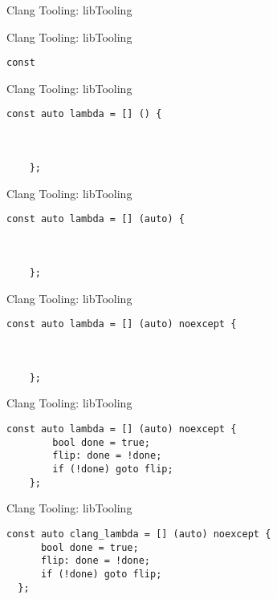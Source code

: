 \begin{frame}[fragile]{Clang Tooling: libTooling}
\end{frame}

\begin{frame}[fragile]{Clang Tooling: libTooling}
  \begin{lstlisting}[basicstyle=\large\ttfamily]
    const
  \end{lstlisting}
  \vspace{2cm}
\end{frame}

\begin{frame}[fragile]{Clang Tooling: libTooling}
  \begin{lstlisting}[basicstyle=\large\ttfamily]
    const auto lambda = [] () {



    };
  \end{lstlisting}
\end{frame}

\begin{frame}[fragile]{Clang Tooling: libTooling}
  \begin{lstlisting}[basicstyle=\large\ttfamily]
    const auto lambda = [] (auto) {



    };
  \end{lstlisting}
\end{frame}

\begin{frame}[fragile]{Clang Tooling: libTooling}
  \begin{lstlisting}[basicstyle=\large\ttfamily]
    const auto lambda = [] (auto) noexcept {



    };
  \end{lstlisting}
\end{frame}

\begin{frame}[fragile]{Clang Tooling: libTooling}
  \begin{lstlisting}[basicstyle=\large\ttfamily]
    const auto lambda = [] (auto) noexcept {
        bool done = true;
        flip: done = !done;
        if (!done) goto flip;
    };
  \end{lstlisting}
\end{frame}

\begin{frame}[fragile]{Clang Tooling: libTooling}
  \begin{lstlisting}[basicstyle=\large\ttfamily]
  const auto clang_lambda = [] (auto) noexcept {
      bool done = true;
      flip: done = !done;
      if (!done) goto flip;
  };
  \end{lstlisting}
\end{frame}
